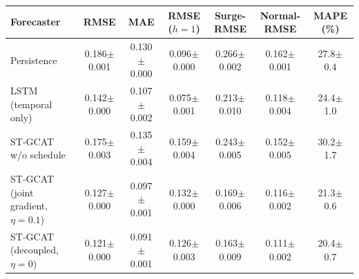 \begin{tabular}{lcccccc}
\toprule
Forecaster & RMSE & MAE & RMSE ($h{=}1$) & Surge-RMSE & Normal-RMSE & MAPE (\%) \\
\midrule
Persistence & 0.186{\tiny$\pm$0.001} & 0.130{\tiny$\pm$0.000} & 0.096{\tiny$\pm$0.000} & 0.266{\tiny$\pm$0.002} & 0.162{\tiny$\pm$0.001} & 27.8{\tiny$\pm$0.4} \\
LSTM (temporal only) & 0.142{\tiny$\pm$0.000} & 0.107{\tiny$\pm$0.002} & 0.075{\tiny$\pm$0.001} & 0.213{\tiny$\pm$0.010} & 0.118{\tiny$\pm$0.004} & 24.4{\tiny$\pm$1.0} \\
ST-GCAT w/o schedule & 0.175{\tiny$\pm$0.003} & 0.135{\tiny$\pm$0.004} & 0.159{\tiny$\pm$0.004} & 0.243{\tiny$\pm$0.005} & 0.152{\tiny$\pm$0.005} & 30.2{\tiny$\pm$1.7} \\
ST-GCAT (joint gradient, $\eta{=}0.1$) & 0.127{\tiny$\pm$0.000} & 0.097{\tiny$\pm$0.001} & 0.132{\tiny$\pm$0.000} & 0.169{\tiny$\pm$0.006} & 0.116{\tiny$\pm$0.002} & 21.3{\tiny$\pm$0.6} \\
ST-GCAT (decoupled, $\eta{=}0$) & 0.121{\tiny$\pm$0.000} & 0.091{\tiny$\pm$0.001} & 0.126{\tiny$\pm$0.003} & 0.163{\tiny$\pm$0.009} & 0.111{\tiny$\pm$0.002} & 20.4{\tiny$\pm$0.7} \\
\bottomrule
\end{tabular}
